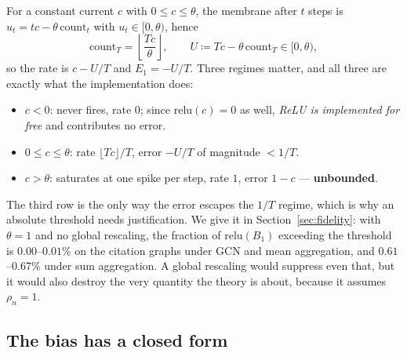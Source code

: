 \documentclass[10pt,twocolumn]{article}
\newcommand{\Bone}{B_{1}}
\newcommand{\Eone}{E_{1}}
\newcommand{\rhon}{\rho_{n}}
\newcommand{\secref}[1]{Section~\ref{#1}}
\begin{document}
For a constant current $c$ with $0 \le c \le \theta$, the membrane after $t$ steps is
$u_{t} = tc - \theta\,\mathrm{count}_{t}$ with $u_{t} \in [0,\theta)$, hence
\begin{equation}
\mathrm{count}_{T} = \left\lfloor \frac{Tc}{\theta} \right\rfloor,
\qquad U \coloneqq Tc - \theta\,\mathrm{count}_{T} \in [0,\theta),
\label{eq:floor}
\end{equation}
so the rate is $c - U/T$ and $\Eone = -U/T$. Three regimes matter, and all three are exactly what
the implementation does:
\begin{itemize}\itemsep1pt
\item $c < 0$: never fires, rate $0$; since $\mathrm{relu}(c) = 0$ as well, \emph{ReLU is implemented
for free} and contributes no error.
\item $0 \le c \le \theta$: rate $\lfloor Tc \rfloor / T$, error $-U/T$ of magnitude $< 1/T$.
\item $c > \theta$: saturates at one spike per step, rate $1$, error $1-c$ --- \textbf{unbounded}.
\end{itemize}
The third row is the only way the error escapes the $1/T$ regime, which is why an absolute threshold
needs justification. We give it in \secref{sec:fidelity}: with $\theta = 1$ and no global rescaling,
the fraction of $\mathrm{relu}(\Bone)$ exceeding the threshold is $0.00$--$0.01\%$ on the citation
graphs under GCN and mean aggregation, and $0.61$--$0.67\%$ under sum aggregation. A global
rescaling would suppress even that, but it would also destroy the very quantity the theory is about,
because it assumes $\rhon = 1$.

\subsection{The bias has a closed form}
\label{sec:bias}
\end{document}
